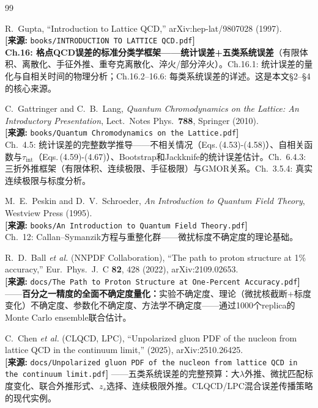 \documentclass[12pt,a4paper]{ctexart}
\begin{document}
\begin{thebibliography}{99}

R.~Gupta,
``Introduction to Lattice QCD,''
arXiv:hep-lat/9807028 (1997).
\\\textbf{[来源:} \texttt{books/INTRODUCTION TO LATTICE QCD.pdf}\textbf{]}
\\\textbf{Ch.16: 格点QCD误差的标准分类学框架——统计误差+五类系统误差}（有限体积、离散化、手征外推、重夸克离散化、淬火/部分淬火）。Ch.16.1: 统计误差的量化与自相关时间的物理分析；Ch.16.2--16.6: 每类系统误差的详述。这是本文§2--§4的核心来源。

C.~Gattringer and C.~B.~Lang,
\textit{Quantum Chromodynamics on the Lattice: An Introductory Presentation},
Lect.\ Notes Phys.\ \textbf{788}, Springer (2010).
\\\textbf{[来源:} \texttt{books/Quantum Chromodynamics on the Lattice.pdf}\textbf{]}
\\Ch.~4.5: 统计误差的完整数学推导——不相关情况（Eqs.\,(4.53)-(4.58)）、自相关函数与$\tau_{\text{int}}$（Eqs.\,(4.59)-(4.67)）、Bootstrap和Jackknife的统计误差估计。Ch.~6.4.3: 三折外推框架（有限体积、连续极限、手征极限）与GMOR关系。Ch.~3.5.4: 真实连续极限与标度分析。

M.~E.~Peskin and D.~V.~Schroeder,
\textit{An Introduction to Quantum Field Theory},
Westview Press (1995).
\\\textbf{[来源:} \texttt{books/An Introduction to Quantum Field Theory.pdf}\textbf{]}
\\Ch.~12: Callan--Symanzik方程与重整化群——微扰标度不确定度的理论基础。

R.~D.~Ball \textit{et al.} (NNPDF Collaboration),
``The path to proton structure at 1\% accuracy,''
Eur.\ Phys.\ J.\ C \textbf{82}, 428 (2022), arXiv:2109.02653.
\\\textbf{[来源:} \texttt{docs/The Path to Proton Structure at One-Percent Accuracy.pdf}\textbf{]}
——\textbf{百分之一精度的全面不确定度量化：}实验不确定度、理论（微扰核截断+标度变化）不确定度、参数化不确定度、方法学不确定度——通过1000个replica的Monte Carlo ensemble联合估计。

C.~Chen \textit{et al.} (CLQCD, LPC),
``Unpolarized gluon PDF of the nucleon from lattice QCD in the continuum limit,''
(2025), arXiv:2510.26425.
\\\textbf{[来源:} \texttt{docs/Unpolarized gluon PDF of the nucleon from lattice QCD in the continuum limit.pdf}\textbf{]}
——五类系统误差的完整预算：大$\lambda$外推、微扰匹配标度变化、联合外推形式、$z_s$选择、连续极限外推。CLQCD/LPC混合误差传播策略的现代实例。


\end{thebibliography}
\end{document}
